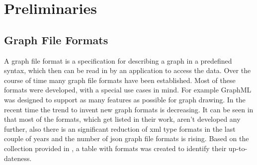 \chapter{Preliminaries}
\label{Preliminaries}
\section{Graph File Formats}
A graph file format is a specification for describing a graph in a predefined syntax, which then can be read in by an application to access the data. Over the course of time many graph file formats have been established. Most of these formats were developed, with a special use cases in mind. For example GraphML was designed to support as many features as possible for graph drawing\cite{Roughan.10.03.2015}.
In the recent time the trend to invent new graph formats is decreasing. It can be seen in \cite{Roughan.10.03.2015} that most of the formats, which get listed in their work, aren't developed any further, also there is an significant reduction of xml type formats in the last couple of years and the number of json graph file formats is rising.
Based on the collection provided in \cite{Roughan.10.03.2015}, a table with formats was created to identify their up-to-dateness.

